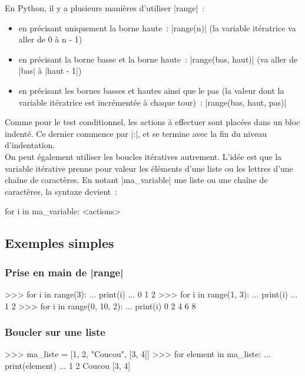 		En Python, il y a plusieurs manières d'utiliser \python|range|~:
		\begin{itemize}
			\item en précisant uniquement la borne haute~: \python|range(n)| (la variable itératrice va aller de 0 à n - 1)
			\item en précisant la borne basse et la borne haute~: \python|range(bas, haut)| (va aller de \python|bas| à \python|haut - 1|)
			\item en précisant les bornes basses et hautes ainsi que le pas (la valeur dont la variable itératrice est incrémentée à chaque tour)~: \python|range(bas, haut, pas)|
		\end{itemize}
		
		Comme pour le test conditionnel, les actions à effectuer sont placées dans un bloc indenté. Ce dernier commence par \python|:|, et se termine avec la fin du niveau d'indentation. \\
		
		On peut également utiliser les boucles itératives autrement. L'idée est que la variable itérative prenne pour valeur les éléments d'une liste ou les lettres d'une chaîne de caractères. En notant \python|ma_variable| une liste ou une chaîne de caractères, la syntaxe devient~:
		\begin{pythoncode}
			for i in ma_variable:
				<actions>
		\end{pythoncode} 
		
	\subsection{Exemples simples}
	
		\subsubsection{Prise en main de \python|range|}
		\begin{pythoncode}
			>>> for i in range(3):
			...     print(i)
			...
			0
			1
			2
			>>> for i in range(1, 3):
			...     print(i)
			...
			1
			2
			>>> for i in range(0, 10, 2):
			...     print(i)
			0
			2
			4
			6
			8
		\end{pythoncode}
		
		\subsubsection{Boucler sur une liste}
		\begin{pythoncode}
			>>> ma_liste = [1, 2, "Coucou", [3, 4]]
			>>> for element in ma_liste:
			...     print(element)
			...
			1
			2
			Coucou
			[3, 4]
		\end{pythoncode}
		
